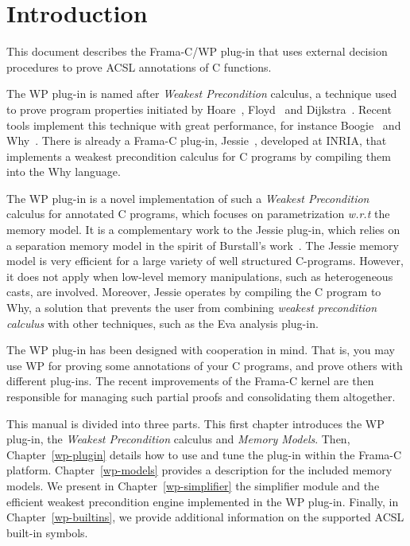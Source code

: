 \chapter{Introduction}

This document describes the \textsf{Frama-C/WP} plug-in that uses external decision procedures
to prove \textsf{ACSL} annotations of \textsf{C} functions.

The \textsf{WP} plug-in is named after \emph{Weakest Precondition}
calculus, a technique used to prove program properties initiated by
Hoare~\cite{Hoare1969}, Floyd~\cite{Floyd1967} and
Dijkstra~\cite{Dijkstra1968}. Recent tools implement this technique
with great performance, for instance \textsf{Boogie}~\cite{Leino2008}
and \textsf{Why}~\cite{Filliatre2003}. There is already a
\textsf{Frama-C} plug-in, \textsf{Jessie}~\cite{Jessie2009}, developed
at \textsc{INRIA}, that implements a weakest precondition calculus for
\textsf{C} programs by compiling them into the \textsf{Why} language.

The \textsf{WP} plug-in is a novel implementation of such a
\emph{Weakest Precondition} calculus for annotated \textsf{C}
programs, which focuses on parametrization \emph{w.r.t} the memory model.
It is a complementary work to the \textsf{Jessie} plug-in, which relies on a
separation memory model in the spirit of Burstall's
work~\cite{Burstall1972}.  The \textsf{Jessie} memory model is very
efficient for a large variety of well structured \textsf{C}-programs.
However, it does not apply when low-level memory manipulations, such as
heterogeneous casts, are involved. Moreover, \textsf{Jessie}
operates by compiling the \textsf{C} program to \textsf{Why}, a
solution that prevents the user from combining \textit{weakest
  precondition calculus} with other techniques, such as the
\textsf{Eva} analysis plug-in.

The \textsf{WP} plug-in has been designed with cooperation in
mind. That is, you may use \textsf{WP} for proving some annotations of
your \textsf{C} programs, and prove others with
different plug-ins. The recent improvements of the \textsf{Frama-C} kernel
are then responsible for managing such partial proofs and consolidating
them altogether.

This manual is divided into three parts. This first chapter introduces
the \textsf{WP} plug-in, the \emph{Weakest Precondition} calculus and
\emph{Memory Models}. Then, Chapter~\ref{wp-plugin} details how to use
and tune the plug-in within the \textsf{Frama-C}
platform. Chapter~\ref{wp-models} provides a description for the
included memory models. We present in Chapter~\ref{wp-simplifier} the
simplifier module and the efficient weakest precondition engine implemented
in the \textsf{WP} plug-in. Finally, in Chapter~\ref{wp-builtins}, we
provide additional information on the supported ACSL built-in symbols.


